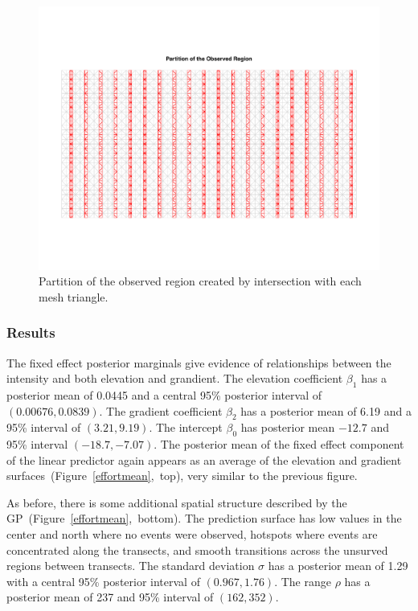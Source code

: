 \documentclass[]{interact}
\begin{document}
\begin{figure}[h]
\includegraphics[width=\textwidth]{figures/bei-effort_partition.pdf}
\caption{Partition of the observed region created by intersection with each
mesh triangle.}
\label{effortpartition}
\end{figure}

\subsubsection{Results}

The fixed effect posterior marginals give evidence of relationships between
the intensity and both elevation and grandient. The elevation coefficient
\(\beta_{1}\) has a posterior mean of 0.0445 and a central 95\% posterior
interval of \((0.00676, 0.0839)\). The gradient coefficient \(\beta_{2}\) has
a posterior mean of 6.19 and a 95\% interval of \((3.21, 9.19)\). The
intercept \(\beta_{0}\) has posterior mean \(-12.7\) and 95\% interval
\((-18.7, -7.07)\). The posterior mean of the fixed effect component of the
linear predictor again appears as an average of the elevation and gradient
surfaces~(Figure~\ref{effortmean},~top), very similar to the previous figure.

As before, there is some additional spatial structure described by the
GP~(Figure~\ref{effortmean},~bottom). The prediction surface has low values
in the center and north where no events were observed, hotspots where events
are concentrated along the transects, and smooth transitions across the
unsurved regions between transects. The standard deviation \(\sigma\) has a
posterior mean of 1.29 with a central 95\% posterior interval of
\((0.967, 1.76)\). The range \(\rho\) has a posterior mean of 237 and
95\% interval of \((162, 352)\).
\end{document}
